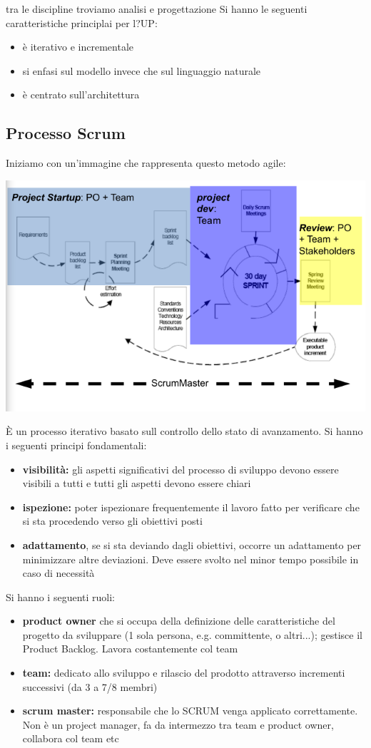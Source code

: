 \documentclass[a4paper,12pt, oneside]{book}
\begin{document}
tra le discipline troviamo analisi e progettazione
Si hanno le seguenti caratteristiche principlai per l?UP:
\begin{itemize}
\item è iterativo e incrementale
\item si enfasi sul modello invece che sul linguaggio naturale
\item è centrato sull'architettura
\end{itemize}
\subsection{Processo Scrum}
Iniziamo con un'immagine che rappresenta questo metodo agile:
\begin{center}
\includegraphics[scale=0.65]{img/ms10.png}
\end{center}
È un processo iterativo basato sull controllo dello stato di
avanzamento. Si hanno i seguenti principi fondamentali:
\begin{itemize}
\item \textbf{visibilità:} gli aspetti significativi del processo di sviluppo devono essere visibili a tutti e tutti gli aspetti devono essere chiari
\item \textbf{ispezione:} poter ispezionare frequentemente il lavoro fatto per verificare che si sta procedendo verso gli
obiettivi posti
\item \textbf{adattamento}, se si sta deviando dagli obiettivi, occorre un adattamento per minimizzare altre deviazioni. Deve essere svolto nel minor tempo possibile in caso di necessità
\end{itemize}
Si hanno i seguenti ruoli:
\begin{itemize}
\item \textbf{product owner} che si occupa della definizione delle
caratteristiche del progetto da sviluppare (1 sola
persona, e.g. committente, o altri...); gestisce il
Product Backlog. Lavora costantemente col team
\item \textbf{team:} dedicato allo sviluppo e rilascio del
prodotto attraverso incrementi successivi (da 3 a
7/8 membri)
\item \textbf{scrum master:} responsabile che lo SCRUM venga
applicato correttamente. Non è un project manager, fa da intermezzo tra team e product owner, collabora col team etc
\end{itemize}
\end{document}
